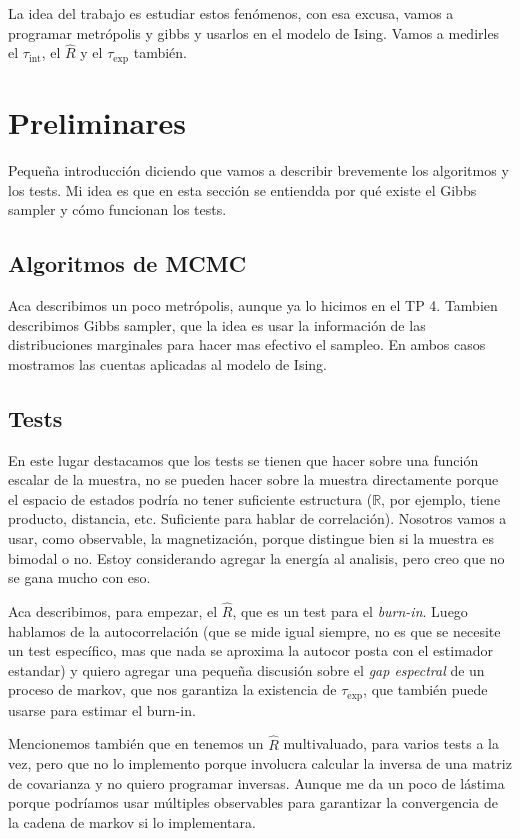 \documentclass[a4paper, 12pt]{article}
\newcommand{\R}{\mathbb{R}}
\newcommand{\tauint}{\tau_\text{int}}
\newcommand{\tauexp}{\tau_\text{exp}}
\begin{document}
La idea del trabajo es estudiar estos fenómenos, con esa excusa, vamos a programar metrópolis y gibbs y usarlos en el modelo de Ising. Vamos a medirles el $\tauint$, el $\hat{R}$ y el $\tauexp$ también.

\section{Preliminares}

Pequeña introducción diciendo que vamos a describir brevemente los algoritmos y los tests. Mi idea es que en esta sección se entiendda por qué existe el Gibbs sampler y cómo funcionan los tests.

\subsection{Algoritmos de MCMC}

Aca describimos un poco metrópolis, aunque ya lo hicimos en el TP 4. Tambien describimos Gibbs sampler, que la idea es usar la información de las distribuciones marginales para hacer mas efectivo el sampleo. En ambos casos mostramos las cuentas aplicadas al modelo de Ising.

\subsection{Tests}

En este lugar destacamos que los tests se tienen que hacer sobre una función escalar de la muestra, no se pueden hacer sobre la muestra directamente porque el espacio de estados podría no tener suficiente estructura ($\R$, por ejemplo, tiene producto, distancia, etc. Suficiente para hablar de correlación). Nosotros vamos a usar, como observable, la magnetización, porque distingue bien si la muestra es bimodal o no. Estoy considerando agregar la energía al analisis, pero creo que no se gana mucho con eso.

Aca describimos, para empezar, el $\hat{R}$, que es un test para el {\it burn-in}. Luego hablamos de la autocorrelación (que se mide igual siempre, no es que se necesite un test específico, mas que nada se aproxima la autocor posta con el estimador estandar) y quiero agregar una pequeña discusión sobre el {\it gap espectral} de un proceso de markov, que nos garantiza la existencia de $\tauexp$, que también puede usarse para estimar el burn-in.

Mencionemos también que en \cite{brooks1998general} tenemos un $\hat{R}$ multivaluado, para varios tests a la vez, pero que no lo implemento porque involucra calcular la inversa de una matriz de covarianza y no quiero programar inversas. Aunque me da un poco de lástima porque podríamos usar múltiples observables para garantizar la convergencia de la cadena de markov si lo implementara.
\end{document}
